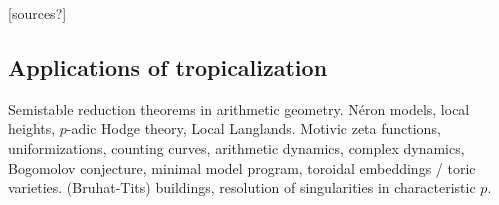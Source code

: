 [sources?]





\subsection{Applications of tropicalization}

Semistable reduction theorems in arithmetic geometry. N\'eron models, 
local heights, $p$-adic Hodge theory, Local Langlands. Motivic zeta 
functions, uniformizations, counting curves, arithmetic dynamics, 
complex dynamics, Bogomolov conjecture, minimal model program, 
toroidal embeddings / toric varieties. (Bruhat-Tits) buildings, resolution 
of singularities in characteristic $p$. 




